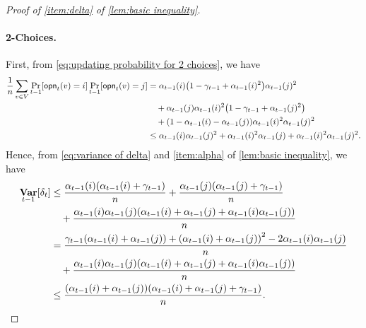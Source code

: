 \documentclass[letterpaper,11pt]{article}
\DeclarePairedDelimiter{\rbra}{\lparen}{\rparen} %
\DeclarePairedDelimiter{\sbra}{\lbrack}{\rbrack} %
\DeclareMathOperator*{\Var}{\mathbf{Var}}
\newcommand{\alphanorm}{\gamma}
\newcommand{\opinion}{\mathsf{opn}}
\begin{document}
\begin{proof}[Proof of \cref{item:delta} of \cref{lem:basic inequality}]
    \paragraph*{2-Choices.}
    First, from \cref{eq:updating probability for 2 choices}, we have
    \begin{align*}
        \frac{1}{n}\sum_{v\in V}\Pr_{t-1}\sbra*{\opinion_t(v)=i}\Pr_{t-1}\sbra*{\opinion_t(v)=j}
        &=\alpha_{t-1}(i)\rbra*{1-\alphanorm_{t-1}+\alpha_{t-1}(i)^2}\alpha_{t-1}(j)^2\\
        &\hspace{1em}+\alpha_{t-1}(j)\alpha_{t-1}(i)^2\rbra*{1-\alphanorm_{t-1}+\alpha_{t-1}(j)^2}\\
        &\hspace{1em}+\rbra*{1-\alpha_{t-1}(i)-\alpha_{t-1}(j)}\alpha_{t-1}(i)^2\alpha_{t-1}(j)^2\\
        &\leq \alpha_{t-1}(i)\alpha_{t-1}(j)^2+\alpha_{t-1}(i)^2\alpha_{t-1}(j)+\alpha_{t-1}(i)^2\alpha_{t-1}(j)^2.
    \end{align*}
    Hence, from \cref{eq:variance of delta} and \cref{item:alpha} of \cref{lem:basic inequality}, we have
    \begin{align*}
        \Var_{t-1}[\delta_t]
        &\leq \frac{\alpha_{t-1}(i)(\alpha_{t-1}(i)+\alphanorm_{t-1})}{n}
        +\frac{\alpha_{t-1}(j)(\alpha_{t-1}(j)+\alphanorm_{t-1})}{n}\\
        &\hspace{1em}+\frac{\alpha_{t-1}(i)\alpha_{t-1}(j)\qty(\alpha_{t-1}(i)+\alpha_{t-1}(j)+\alpha_{t-1}(i)\alpha_{t-1}(j))}{n}\\
        &= \frac{\alphanorm_{t-1}\qty(\alpha_{t-1}(i)+\alpha_{t-1}(j))+\qty(\alpha_{t-1}(i)+\alpha_{t-1}(j))^2-2\alpha_{t-1}(i)\alpha_{t-1}(j)}{n}\\
        &\hspace{1em}+\frac{\alpha_{t-1}(i)\alpha_{t-1}(j)\qty(\alpha_{t-1}(i)+\alpha_{t-1}(j)+\alpha_{t-1}(i)\alpha_{t-1}(j))}{n}\\
        &\leq \frac{(\alpha_{t-1}(i)+\alpha_{t-1}(j))(\alpha_{t-1}(i)+\alpha_{t-1}(j)+\alphanorm_{t-1})}{n}.
    \end{align*}
\end{proof}
\end{document}
